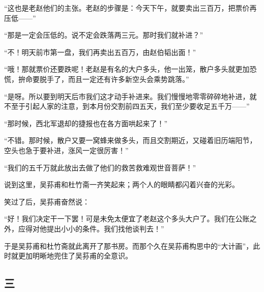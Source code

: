 \par “这也是老赵他们的主张。老赵的步骤是：今天下午，就要卖出三百万，把票价再压低——”
\par “那是一定会压低的。说不定会跌落两三元。那时我们就补进？”
\par “不！明天前市第一盘，我们再卖出五百万，由赵伯韬出面！”
\par “哦！那就票价还要跌呢！老赵是有名的大户多头，他一出笼，散户多头就更加恐慌，拚命要脱手了，而且一定还有许多新空头会乘势跳落。”
\par “是呀。所以要到明天后市我们这才动手补进来。我们慢慢地零零碎碎地补进，就不至于引起人家的注意，到本月份交割前四五天，我们至少要收足五千万——”
\par “那时候，西北军退却的捷报也在各方面哄起来了！”
\par “不错。那时候，散户又要一窝蜂来做多头，而且交割期近，又碰着旧历端阳节，空头也急于要补进，涨风一定很厉害！”
\par “我们的五千万就此放出去做了他们的救苦救难观世音菩萨！”
\par 说到这里，吴荪甫和杜竹斋一齐笑起来；两个人的眼睛都闪着兴奋的光彩。
\par 笑过了后，吴荪甫奋然说：
\par “好！我们决定干一下罢！可是未免太便宜了老赵这个多头大户了。我们在公账之外，应得对他提出小小的条件。我们找他谈判去！”
\par 于是吴荪甫和杜竹斋就此离开了那书房。而那个久在吴荪甫构思中的“大计画”，此时就更加明晰地兜住了吴荪甫的全意识。


\subsection*{三}


